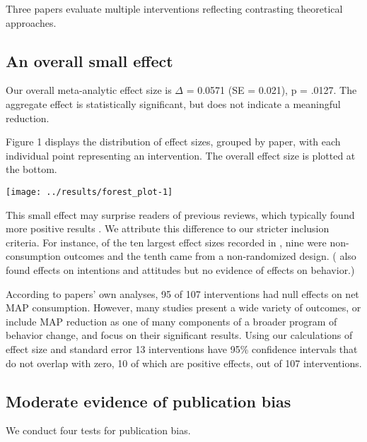 \documentclass[sn-nature,pdflatex]{sn-jnl}
\begin{document}
Three papers \citep{piester2020, hennessy2016, kanchanachitra2020}
evaluate multiple interventions reflecting contrasting theoretical
approaches.

\subsection{An overall small effect}\label{sec2.2}

Our overall meta-analytic effect size is \(\Delta\) = 0.0571 (SE =
0.021), p = .0127. The aggregate effect is statistically significant,
but does not indicate a meaningful reduction.

Figure 1 displays the distribution of effect sizes, grouped by paper,
with each individual point representing an intervention. The overall
effect size is plotted at the bottom.

\texttt{[image: ../results/forest\_plot-1]}

This small effect may surprise readers of previous reviews, which
typically found more positive results
\citep{mathur2021meta, meier2022, chang2023}. We attribute this
difference to our stricter inclusion criteria. For instance, of the ten
largest effect sizes recorded in \citep{mathur2021effectiveness}, nine
were non-consumption outcomes and the tenth came from a non-randomized
design. (\citep{bianchi2018conscious} also found effects on intentions
and attitudes but no evidence of effects on behavior.)

According to papers' own analyses, 95 of 107 interventions had null
effects on net MAP consumption. However, many studies present a wide
variety of outcomes, or include MAP reduction as one of many components
of a broader program of behavior change, and focus on their significant
results. Using our calculations of effect size and standard error 13
interventions have 95\% confidence intervals that do not overlap with
zero, 10 of which are positive effects, out of 107 interventions.

\subsection{Moderate evidence of publication bias}\label{sec2.3}

We conduct four tests for publication bias.

\begin{comment} 
introductory remarks about how this puts our main results in one light or another? 
\end{comment}
\end{document}
